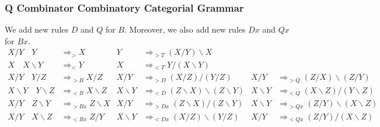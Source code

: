 \documentclass[aspectratio=169]{beamer}
\begin{document}
\begin{frame}[t]
	\frametitle{Q Combinator Combinatory Categorial Grammar}
	We add new rules \(D\) and \(Q\) for \(B\).
	Moreover, we also add new rules \(Dx\) and \(Qx\) for \(Bx\).
	\begin{align*}
		X/Y\quad Y                        & \Rightarrow_{>} X                                          &
		Y                                 & \Rightarrow_{>T} (X/Y)\backslash X                           \\
		X\quad  X\backslash Y             & \Rightarrow_{<} Y                                          &
		X                                 & \Rightarrow_{<T} Y / (X\backslash Y)                         \\
		X/Y\quad  Y/Z                     & \Rightarrow_{>B} X/Z                                       &
		X/Y                               & \Rightarrow_{>D} (X/Z)/(Y/Z)                               &
		X/Y                               & \Rightarrow_{>Q} (Z/X)\backslash (Z/Y)                       \\
		X\backslash Y\quad  Y\backslash Z & \Rightarrow_{<B} X\backslash Z                             &
		X\backslash Y                     & \Rightarrow_{<D} (Z\backslash X)\backslash (Z\backslash Y) &
		X\backslash Y                     & \Rightarrow_{<Q} (X\backslash Z)/(Y\backslash Z)             \\
		X/Y\quad  Z\backslash Y           & \Rightarrow_{>Bx} Z\backslash X                            &
		X/Y                               & \Rightarrow_{>Dx} (Z\backslash X)/(Z\backslash Y)          &
		X\backslash Y                     & \Rightarrow_{>Qx} (Z/Y) \backslash (X\backslash Z)           \\
		X/Y\quad  X\backslash Z           & \Rightarrow_{<Bx} Z/Y                                      &
		X\backslash Y                     & \Rightarrow_{<Dx} (X/Z)\backslash (Y/Z)                    &
		X/Y                               & \Rightarrow_{<Qx} (Z/Y)/(X\backslash Z)
	\end{align*}
\end{frame}
\end{document}
